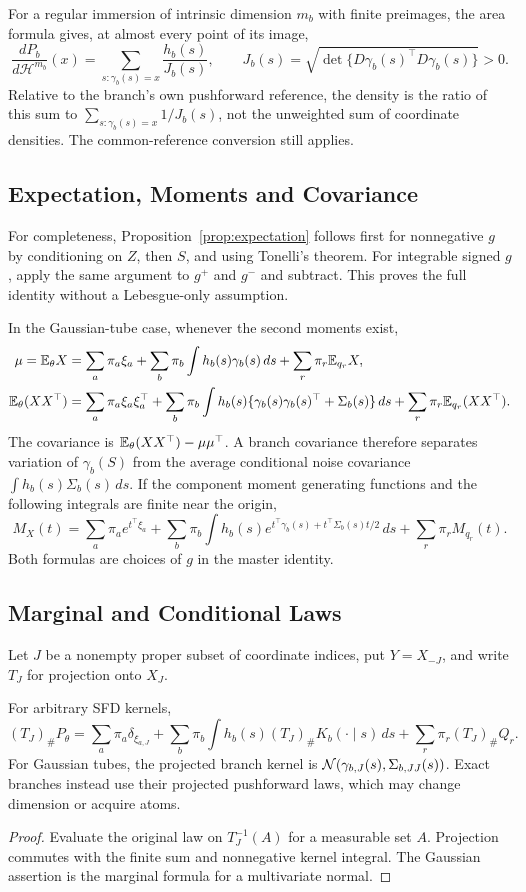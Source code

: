 For a regular immersion of intrinsic dimension $m_b$ with finite preimages,
the area formula gives, at almost every point of its image,
\[
 \frac{dP_b}{d\mathcal H^{m_b}}(x)
   =\sum_{s:\gamma_b(s)=x}\frac{h_b(s)}{J_b(s)},\qquad
 J_b(s)=\sqrt{\det\{D\gamma_b(s)^\top D\gamma_b(s)\}}>0.
\]
Relative to the branch's own pushforward reference, the density is the ratio
of this sum to $\sum_{s:\gamma_b(s)=x}1/J_b(s)$, not the unweighted sum of
coordinate densities. The common-reference conversion still applies.

\subsection{Expectation, Moments and Covariance}
For completeness, Proposition~\ref{prop:expectation} follows first for
nonnegative $g$ by conditioning on $Z$, then $S$, and using Tonelli's theorem.
For integrable signed $g$, apply the same argument to $g^+$ and $g^-$ and
subtract. This proves the full identity without a Lebesgue-only assumption.

In the Gaussian-tube case, whenever the second moments exist,
\begin{align*}
 \mu=\mathbb E_\theta X
 &=\sum_a\pi_a\xi_a+\sum_b\pi_b\int h_b(s)\gamma_b(s)\,ds
                         +\sum_r\pi_r\mathbb E_{q_r}X,\\
 \mathbb E_\theta(XX^\top)
 &=\sum_a\pi_a\xi_a\xi_a^\top
   +\sum_b\pi_b\int h_b(s)
       \{\gamma_b(s)\gamma_b(s)^\top+\Sigma_b(s)\}\,ds
   +\sum_r\pi_r\mathbb E_{q_r}(XX^\top).
\end{align*}
The covariance is $\mathbb E_\theta(XX^\top)-\mu\mu^\top$. A branch covariance
therefore separates variation of $\gamma_b(S)$ from the average conditional
noise covariance $\int h_b(s)\Sigma_b(s)\,ds$. If the component moment
generating functions and the following integrals are finite near the origin,
\[
 M_X(t)=\sum_a\pi_a e^{t^\top\xi_a}
 +\sum_b\pi_b\int h_b(s)
   e^{t^\top\gamma_b(s)+t^\top\Sigma_b(s)t/2}\,ds
 +\sum_r\pi_r M_{q_r}(t).
\]
Both formulas are choices of $g$ in the master identity.

\subsection{Marginal and Conditional Laws}
Let $J$ be a nonempty proper subset of coordinate indices, put $Y=X_{-J}$,
and write $T_J$ for projection onto $X_J$.

\begin{proposition}
\label{prop:marginal}
For arbitrary SFD kernels,
\[
 (T_J)_\#P_\theta
  =\sum_a\pi_a\delta_{\xi_{a,J}}
    +\sum_b\pi_b\int h_b(s)(T_J)_\#K_b(\cdot\mid s)\,ds
    +\sum_r\pi_r(T_J)_\#Q_r.
\]
For Gaussian tubes, the projected branch kernel is
$\mathcal N(\gamma_{b,J}(s),\Sigma_{b,JJ}(s))$. Exact branches instead use
their projected pushforward laws, which may change dimension or acquire atoms.
\end{proposition}
\begin{proof}
Evaluate the original law on $T_J^{-1}(A)$ for a measurable set $A$.
Projection commutes with the finite sum and nonnegative kernel integral.
The Gaussian assertion is the marginal formula for a multivariate normal.
\end{proof}

